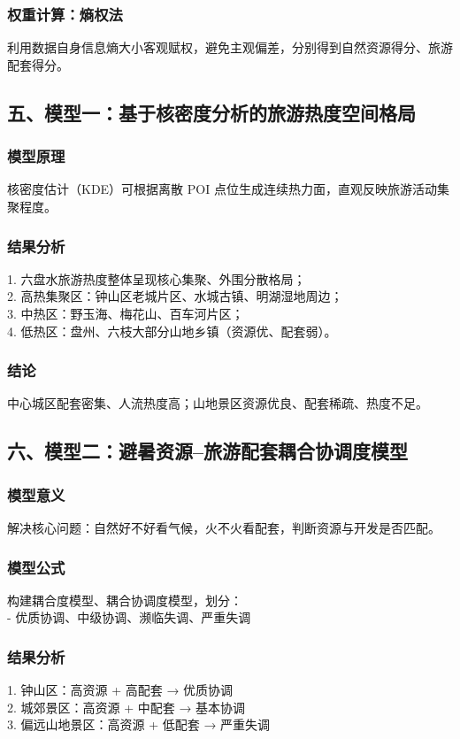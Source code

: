 \subsubsection*{权重计算：熵权法}
利用数据自身信息熵大小客观赋权，避免主观偏差，分别得到自然资源得分、旅游配套得分。

\subsection*{五、模型一：基于核密度分析的旅游热度空间格局}
\subsubsection*{模型原理}
核密度估计（KDE）可根据离散 POI 点位生成连续热力面，直观反映旅游活动集聚程度。
\subsubsection*{结果分析}
1. 六盘水旅游热度整体呈现核心集聚、外围分散格局； \\
2. 高热集聚区：钟山区老城片区、水城古镇、明湖湿地周边； \\
3. 中热区：野玉海、梅花山、百车河片区； \\
4. 低热区：盘州、六枝大部分山地乡镇（资源优、配套弱）。 \\
\subsubsection*{结论}
中心城区配套密集、人流热度高；山地景区资源优良、配套稀疏、热度不足。

\subsection*{六、模型二：避暑资源–旅游配套耦合协调度模型}
\subsubsection*{模型意义}
解决核心问题：自然好不好看气候，火不火看配套，判断资源与开发是否匹配。
\subsubsection*{模型公式}
构建耦合度模型、耦合协调度模型，划分：\\
- 优质协调、中级协调、濒临失调、严重失调
\subsubsection*{结果分析}
1. 钟山区：高资源 + 高配套 → 优质协调 \\
2. 城郊景区：高资源 + 中配套 → 基本协调  \\
3. 偏远山地景区：高资源 + 低配套 → 严重失调 \\
